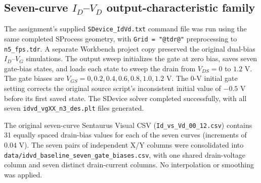 \subsection{Seven-curve $I_D$--$V_D$ output-characteristic family}
The assignment's supplied \texttt{SDevice\_IdVd.txt} command file was
run using the same completed SProcess geometry, with
\texttt{Grid = "@tdr@"} preprocessing to \texttt{n5\_fps.tdr}.
A separate Workbench project copy preserved the original dual-bias
$I_D$--$V_G$ simulations. The output sweep initializes the gate at zero bias, saves seven gate-bias states,
and loads each state to sweep the drain from $V_{DS}=0$ to $1.2$ V.
The gate biases are $V_{GS}=0,0.2,0.4,0.6,0.8,1.0,1.2$ V.
The 0-V initial gate setting corrects the original source script's
inconsistent initial value of $-0.5$ V before its first saved state.
The SDevice solver completed successfully, with all seven
\texttt{idvd\_vgXX\_n3\_des.plt} files generated.

The original seven-curve Sentaurus Visual CSV
(\texttt{Id\_vs\_Vd\_00\_12.csv}) contains 31 equally spaced drain-bias
values for each of the seven curves (increments of $0.04$ V).
The seven pairs of independent X/Y columns were consolidated into
\texttt{data/idvd\_baseline\_seven\_gate\_biases.csv}, with one shared
drain-voltage column and seven distinct drain-current columns.
No interpolation or smoothing was applied.

